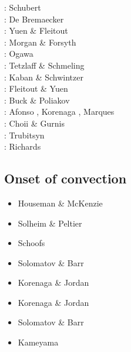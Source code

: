 \begin{scriptsize}
\nineteenseventysix: Schubert \etal \cite{scfy76}\\
\nineteenseventyseven: De Bremaecker \cite{debr77}\\
\nineteeneightyfour: Yuen \& Fleitout \cite{yufl84}\\
\nineteeneightyeight: Morgan \& Forsyth \cite{mofo88}\\
\nineteenninety: Ogawa \cite{ogaw90} \\
\twothousand: Tetzlaff \& Schmeling \cite{tesc00}\\
\twothousandone: Kaban \& Schwintzer \cite{kasc01}\\
\nineteeneightyfour: Fleitout \& Yuen \cite{flyu84} \\
\nineteenninetyeight: Buck \& Poliakov \cite{bupo98}\\
\twothousandseven: Afonso \etal \cite{afrf07}, Korenaga \cite{kore07}, Marques \etal \cite{macl07}\\
\twothousandeight: Choii \& Gurnis \cite{chgu08}\\
\twothousandtwelve: Trubitsyn \cite{trub12} \\
\twothousandeighteen: Richards \etal \cite{rihc18}
\end{scriptsize}

\subsection{Onset of convection}

\begin{scriptsize}
\begin{itemize}
\item[\nineteeneightytwo] Houseman \& McKenzie \cite{homc82}
\item[\nineteenninety] Solheim \& Peltier \cite{sope90}
\item[\twothousand] Schoofs \etal \cite{scth00}
\item[\twothousandsix] Solomatov \& Barr \cite{soba06}
\item[\twothousandtwo] Korenaga \& Jordan \cite{kojo02}
\item[\twothousandtwo] Korenaga \& Jordan \cite{kojo03}
\item[\twothousandseven] Solomatov \& Barr \cite{soba07}
\item[\twothousandfifteen] Kameyama \etal \cite{kamo15}
\end{itemize}
\end{scriptsize}

